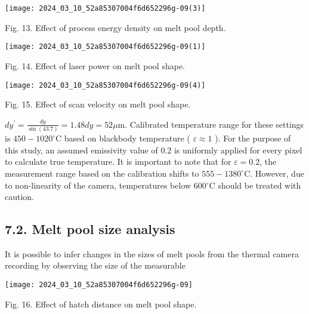 \documentclass[10pt]{article}
\begin{document}
\begin{center}
\texttt{[image: 2024\_03\_10\_52a85307004f6d652296g-09(3)]}
\end{center}

Fig. 13. Effect of process energy density on melt pool depth.

\begin{center}
\texttt{[image: 2024\_03\_10\_52a85307004f6d652296g-09(1)]}
\end{center}

Fig. 14. Effect of laser power on melt pool shape.

\begin{center}
\texttt{[image: 2024\_03\_10\_52a85307004f6d652296g-09(4)]}
\end{center}

Fig. 15. Effect of scan velocity on melt pool shape.

$d y^{\prime}=\frac{d y}{\sin (43.7)}=1.48 d y=52 \mu \mathrm{m}$. Calibrated temperature range for these settings is $450-1020^{\circ} \mathrm{C}$ based on blackbody temperature ( $\varepsilon \approx 1$ ). For the purpose of this study, an assumed emissivity value of 0.2 is uniformly applied for every pixel to calculate true temperature. It is important to note that for $\varepsilon=0.2$, the measurement range based on the calibration shifts to $555-1380^{\circ} \mathrm{C}$. However, due to non-linearity of the camera, temperatures below $600{ }^{\circ} \mathrm{C}$ should be treated with caution.

\subsection*{7.2. Melt pool size analysis}
It is possible to infer changes in the sizes of melt pools from the thermal camera recording by observing the size of the measurable

\begin{center}
\texttt{[image: 2024\_03\_10\_52a85307004f6d652296g-09]}
\end{center}

Fig. 16. Effect of hatch distance on melt pool shape.
\end{document}
